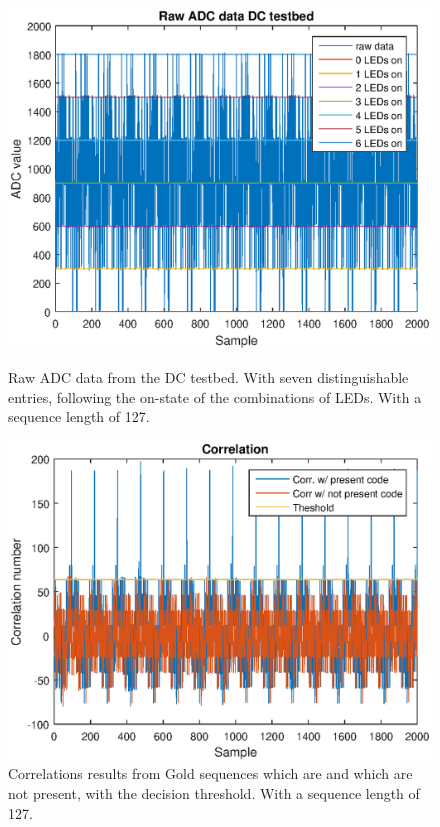 \begin{figure}[!tbp]
  \centering
  \begin{minipage}[b]{0.49\textwidth}
    \includegraphics[width=\textwidth]{chapters/evaluation-chapters/hardware/dc/raw-dc-testbed-adc-data-n=7.eps}
    \caption{Raw ADC data from the DC testbed. With seven distinguishable entries, following the on-state of the combinations of LEDs. With a sequence length of 127.}
	\label{fig:raw-dc-testbed-adc-data-n=7}
  \end{minipage}
  \hfill
  \begin{minipage}[b]{0.49\textwidth}
    \includegraphics[width=\textwidth]{chapters/evaluation-chapters/hardware/dc/correlation-dc-testbed-n=7.eps}
    \caption{Correlations results from Gold sequences which are and which are not present, with the decision threshold. With a sequence length of 127.}
	\label{fig:correlation-dc-testbed-n=7}
  \end{minipage}
\end{figure}


